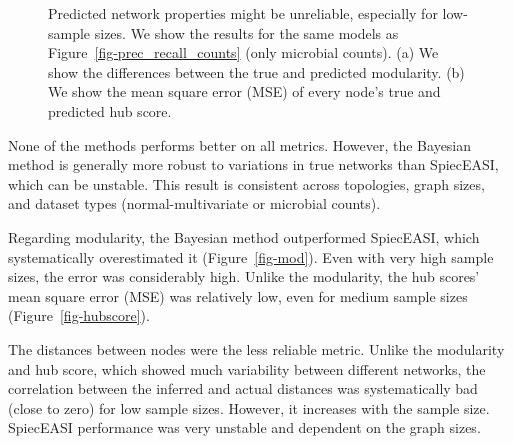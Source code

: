 \documentclass[
  a4paper,
]{article}
\begin{document}
\begin{figure}

\begin{minipage}[t]{\linewidth}

{\centering 


}

\subcaption{\label{fig-mod}}
\end{minipage}%
\newline
\begin{minipage}[t]{\linewidth}

{\centering 


}

\subcaption{\label{fig-hubscore}}
\end{minipage}%

\caption{\label{fig-regression}Predicted network properties might be
unreliable, especially for low-sample sizes. We show the results for the
same models as Figure~\ref{fig-prec_recall_counts} (only microbial
counts). (a) We show the differences between the true and predicted
modularity. (b) We show the mean square error (MSE) of every node's true
and predicted hub score.}

\end{figure}

None of the methods performs better on all metrics. However, the
Bayesian method is generally more robust to variations in true networks
than SpiecEASI, which can be unstable. This result is consistent across
topologies, graph sizes, and dataset types (normal-multivariate or
microbial counts).

Regarding modularity, the Bayesian method outperformed SpiecEASI, which
systematically overestimated it (Figure~\ref{fig-mod}). Even with very
high sample sizes, the error was considerably high. Unlike the
modularity, the hub scores' mean square error (MSE) was relatively low,
even for medium sample sizes (Figure~\ref{fig-hubscore}).

The distances between nodes were the less reliable metric. Unlike the
modularity and hub score, which showed much variability between
different networks, the correlation between the inferred and actual
distances was systematically bad (close to zero) for low sample sizes.
However, it increases with the sample size. SpiecEASI performance was
very unstable and dependent on the graph sizes.
\end{document}
